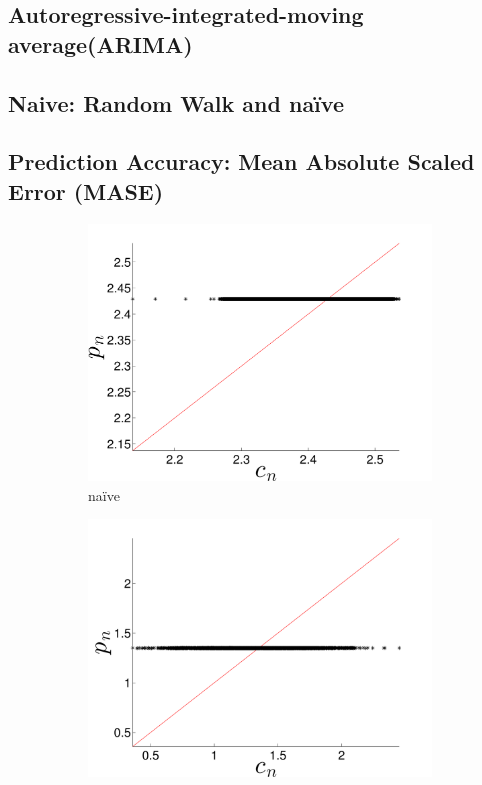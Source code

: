 \subsection{Autoregressive-integrated-moving average(ARIMA)}
\subsection{Naive: Random Walk and na\"ive}
\subsection{Prediction Accuracy: Mean Absolute Scaled Error (MASE)}
\label{sec:accuracy}

\begin{figure}[htbp]
  \centering
      \begin{subfigure}{0.49\textwidth}
    \includegraphics[width=\textwidth]{figs/colMeanForecast}
    \caption{\col na\"ive }
    \label{fig:gccMEAN}
  \end{subfigure}%
   \begin{subfigure}{0.49\textwidth}
    \includegraphics[width=\textwidth]{figs/gccMeanForecast}

\end{subfigure}
\end{figure}
